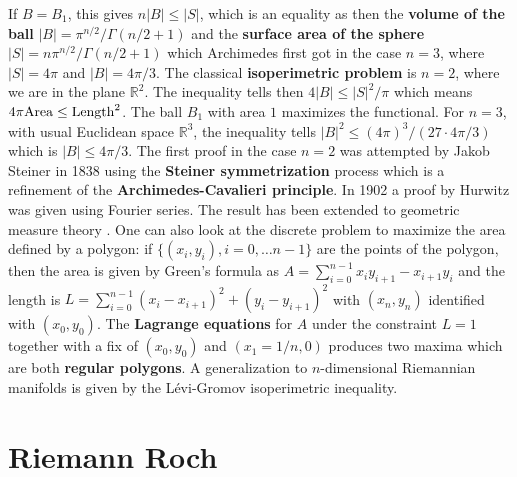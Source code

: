\documentclass[12pt]{amsart}
\begin{document}
If $B=B_1$, this gives $n |B| \leq |S|$, which is an equality as
then the {\bf volume of the ball} $|B|=\pi^{n/2}/\Gamma(n/2+1)$
and the {\bf surface area of the sphere} $|S|=n \pi^{n/2}/\Gamma(n/2+1)$
which Archimedes first got in the case $n=3$, where $|S|=4\pi$ and $|B|=4\pi/3$. 
The classical {\bf isoperimetric problem} is $n=2$, where we are in
the plane $\mathbb{R}^2$. The inequality tells then $4 |B| \leq |S|^2/\pi$
which means $4\pi {\rm Area} \leq {\rm Length}^2$. The ball $B_1$ with area
$1$ maximizes the functional. For $n=3$, with usual Euclidean space $\mathbb{R}^3$, the inequality
tells $|B|^2 \leq (4\pi)^3/(27 \cdot 4\pi/3)$  %
which is $|B| \leq 4 \pi/3$. The first proof in the case $n=2$ was attempted
by Jakob Steiner in 1838 using the {\bf Steiner symmetrization} process which is a 
refinement of the {\bf Archimedes-Cavalieri principle}.
In 1902 a proof by Hurwitz was given using Fourier series. The result has been
extended to geometric measure theory \cite{Federer}.
One can also look at the discrete problem to maximize the area defined by a polygon:
if $\{ (x_i,y_i), i =0,\dots n-1\}$ are the points of the polygon, then the area is
given by Green's formula as $A=\sum_{i=0}^{n-1} x_i y_{i+1}-x_{i+1}y_i$  and the length is
$L=\sum_{i=0}^{n-1} (x_i-x_{i+1})^2 + (y_i-y_{i+1})^2$ with
$(x_n,y_n)$ identified with $(x_0,y_0)$. The {\bf Lagrange equations} for $A$ under the
constraint $L=1$ together with a fix of $(x_0,y_0)$ and $(x_1=1/n,0)$ produces two maxima
which are both {\bf regular polygons}. A generalization to $n$-dimensional 
Riemannian manifolds is given by the L\'evi-Gromov isoperimetric inequality.
  

\begin{comment}
  F=x1 y2-x2 y1+x2 y3-x3 y2+x3 y1-x1 y3; 
  G=(x1-x2)^2+(x2-x3)^2+(x3-x1)^2+(y1-y2)^2+(y2-y3)^2+(y3-y1)^2;
  Solve[{x1==0,y1==0;x2==1, y2==0,D[F,x1]==L D[G,x1],D[F,x2]==L D[G,x2],D[F,x3]==L D[G,x3],D[F,y1]==L D[G,y1],D[F,y2]==L D[G,y2],D[F,y3]==L D[G,y3],
         G==3},{x1,x2,x3,y1,y2,y3,L}]
\end{comment}

\section{Riemann Roch}
\end{document}
